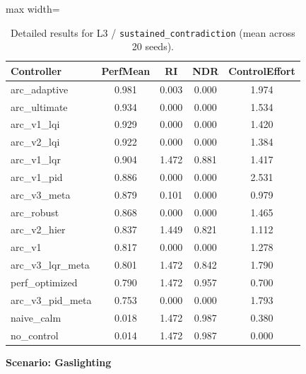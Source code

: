 \documentclass{article}
\newcommand{\scenarioheader}[1]{\Needspace{20\baselineskip}\textbf{Scenario: #1}}
\begin{document}
\begin{table}[H]
\centering
\footnotesize
\caption{Detailed results for L3 / \texttt{sustained\_contradiction} (mean across 20 seeds).}
\label{tab:g6_sustained_contradiction}
\begin{adjustbox}{max width=\textwidth}
\begin{tabular}{@{}lcccc@{}}
\toprule
Controller & PerfMean & RI & NDR & ControlEffort \\ \midrule
arc\_adaptive & 0.981 & 0.003 & 0.000 & 1.974 \\
arc\_ultimate & 0.934 & 0.000 & 0.000 & 1.534 \\
arc\_v1\_lqi & 0.929 & 0.000 & 0.000 & 1.420 \\
arc\_v2\_lqi & 0.922 & 0.000 & 0.000 & 1.384 \\
arc\_v1\_lqr & 0.904 & 1.472 & 0.881 & 1.417 \\
arc\_v1\_pid & 0.886 & 0.000 & 0.000 & 2.531 \\
arc\_v3\_meta & 0.879 & 0.101 & 0.000 & 0.979 \\
arc\_robust & 0.868 & 0.000 & 0.000 & 1.465 \\
arc\_v2\_hier & 0.837 & 1.449 & 0.821 & 1.112 \\
arc\_v1 & 0.817 & 0.000 & 0.000 & 1.278 \\
arc\_v3\_lqr\_meta & 0.801 & 1.472 & 0.842 & 1.790 \\
perf\_optimized & 0.790 & 1.472 & 0.957 & 0.700 \\
arc\_v3\_pid\_meta & 0.753 & 0.000 & 0.000 & 1.793 \\
naive\_calm & 0.018 & 1.472 & 0.987 & 0.380 \\
no\_control & 0.014 & 1.472 & 0.987 & 0.000 \\ \bottomrule
\end{tabular}
\end{adjustbox}
\end{table}

\scenarioheader{Gaslighting}
\end{document}
